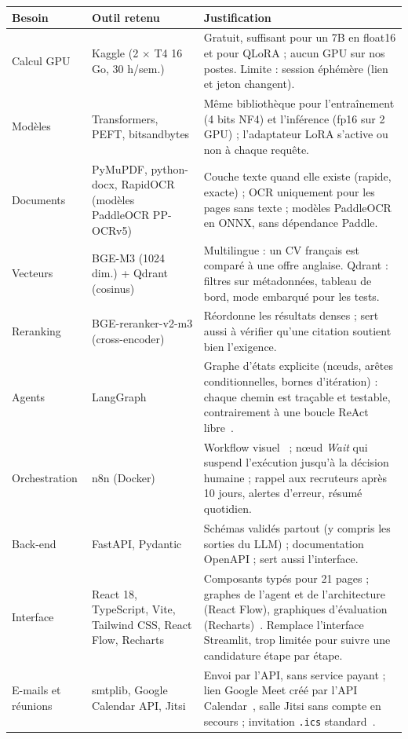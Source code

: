 \documentclass[11pt,a4paper]{report}
\begin{document}
\begin{table}[ht]
\centering\small
\begin{tabularx}{\textwidth}{L{2.3cm}L{3.9cm}Y}
\toprule
\textbf{Besoin} & \textbf{Outil retenu} & \textbf{Justification}\\
\midrule
Calcul GPU & Kaggle (2 $\times$ T4 16 Go, 30 h/sem.) & Gratuit, suffisant pour un 7B en float16 et pour QLoRA ; aucun GPU sur nos postes. Limite : session éphémère (lien et jeton changent).\\
Modèles & Transformers, PEFT, bitsandbytes & Même bibliothèque pour l'entraînement (4 bits NF4) et l'inférence (fp16 sur 2 GPU) ; l'adaptateur LoRA s'active ou non à chaque requête.\\
Documents & PyMuPDF, python-docx, RapidOCR (modèles PaddleOCR PP-OCRv5) & Couche texte quand elle existe (rapide, exacte) ; OCR uniquement pour les pages sans texte ; modèles PaddleOCR en ONNX, sans dépendance Paddle.\\
Vecteurs & BGE-M3 (1024 dim.) + Qdrant (cosinus) & Multilingue : un CV français est comparé à une offre anglaise. Qdrant : filtres sur métadonnées, tableau de bord, mode embarqué pour les tests.\\
Reranking & BGE-reranker-v2-m3 (cross-encoder) & Réordonne les résultats denses ; sert aussi à vérifier qu'une citation soutient bien l'exigence.\\
Agents & LangGraph & Graphe d'états explicite (nœuds, arêtes conditionnelles, bornes d'itération) : chaque chemin est traçable et testable, contrairement à une boucle ReAct~\cite{react} libre~\cite{langgraph}.\\
Orchestration & n8n (Docker) & Workflow visuel~\cite{n8n} ; nœud \emph{Wait} qui suspend l'exécution jusqu'à la décision humaine ; rappel aux recruteurs après 10 jours, alertes d'erreur, résumé quotidien.\\
Back-end & FastAPI, Pydantic & Schémas validés partout (y compris les sorties du LLM) ; documentation OpenAPI ; sert aussi l'interface.\\
Interface & React 18, TypeScript, Vite, Tailwind CSS, React Flow, Recharts & Composants typés pour 21 pages ; graphes de l'agent et de l'architecture (React Flow), graphiques d'évaluation (Recharts)~\cite{react-doc}. Remplace l'interface Streamlit, trop limitée pour suivre une candidature étape par étape.\\
E-mails et réunions & smtplib, Google Calendar API, Jitsi & Envoi par l'API, sans service payant ; lien Google Meet créé par l'API Calendar~\cite{gcal}, salle Jitsi sans compte en secours ; invitation \texttt{.ics} standard~\cite{ics}.\\

\end{tabularx}
\end{table}
\end{document}
